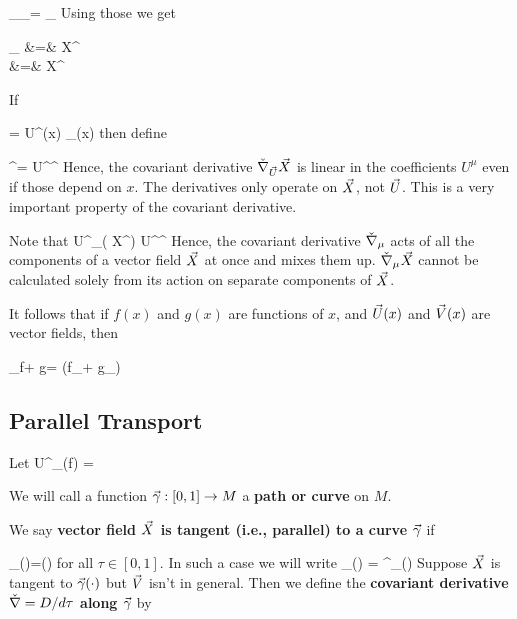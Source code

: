 \beq
\nnabla_\mu \vece_\nu =
\Gamma\indices{^\rho_{\mu\nu}}\vece_\rho
\eeq
Using those we get

\beqa
\nnabla_\mu
 \vecX &=&
\left[
\vece_\nu\partial_\mu
+
\nnabla_\mu( \vece_\nu)
\right]X^\nu
\\
&=&
\left[
\vece_\nu\partial_\mu
+
\Gamma\indices{^\rho_{\mu\nu}}\vece_\rho
\right]X^\nu
\eeqa

\beq
{}
\eeq


If

\beq
\vecU = U^\mu(x) \vece_\mu(x)
\eeq
then
define

\beq
[\nnabla_\vecU \vecX]^\rho = U^\mu [\nnabla_\mu \vecX]^\rho
\eeq
Hence, the covariant derivative
 $\check{\nabla}_{\vec{U}} {\vec{X}}$ is linear in the coefficients $U^\mu$ even if those depend on $x$. The derivatives only operate on ${\vec{X}}$, not ${\vec{U}}$. This is
a very important property of the
covariant derivative.

Note that 
\beq
U^\mu \nnabla_\mu( X^\rho) \neq
U^\mu [\nnabla_\mu X]^\rho
\eeq
Hence,
the covariant derivative 
$\check{\nabla}_\mu$ acts of all the
components of a vector field ${\vec{X}}$ at 
once  and mixes them up. $\check{\nabla}_\mu{\vec{X}}$ cannot be 
calculated solely from its  action on separate components of ${\vec{X}}$.

It follows that if $f(x)$ and $g(x)$ are
functions of $x$, and ${\vec{U}}(x)$ and ${\vec{V}}(x)$
are vector fields, then

\beq
\nnabla_{f\vecU  + g\vecV}\vecX=
(f\nnabla_\vecU + g\nnabla_\vecV)\vecX
\eeq

\subsection{Parallel Transport}

Let
\beq
U^\mu \nnabla_\mu(f) =
\eeq

We will call a function  ${\vec{\gamma}}: [0, 1]\rightarrow M$
a {\bf path or curve} on $M$.

We say {\bf 
 vector field ${\vec{X}}$ is tangent (i.e., parallel) to a curve ${\vec{\gamma}}$} if

\beq
\vecX_{\vgamma(\tau)}=\dot{\vgamma}(\tau)
\eeq
for all  $\tau\in[0,1]$.
In such a case we will write
\beq
\vecX_{\vgamma(\tau)} = \vecX^{\para \vgamma}_{\vgamma(\tau)}
\eeq
Suppose ${\vec{X}}$
is tangent to ${\vec{\gamma}}(\cdot)$
but ${\vec{V}}$ isn't in general.
Then we define the {\bf covariant
derivative $\check{\nabla}=D/d\tau$ 
along ${\vec{\gamma}}$}  by

